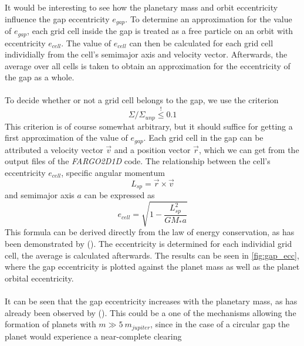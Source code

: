     \newpage
      It would be interesting to see how the planetary mass and orbit 
      eccentricity influence the gap eccentricity $e_{gap}$.
      To determine an approximation for the value of $e_{gap}$, each grid cell 
      inside the gap is treated as a free particle on an orbit with 
      eccentricity $e_{cell}$.
      The value of $e_{cell}$ can then be calculated for each grid cell 
      individially from the cell's semimajor axis and velocity vector. 
      Afterwards, the average over all cells is taken to obtain an 
      approximation for the eccentricity of the gap as a whole. \\
      \\
      To decide whether or not a grid cell belongs to the gap, we use the 
      criterion
      $$\Sigma/\Sigma_{unp}\overset{!}{\leq}0.1$$
      This criterion is of course somewhat arbitrary, but it should suffice 
      for getting a first approximation of the value of $e_{gap}$.
      Each grid cell in the gap can be attributed a velocity vector $\vec v$ 
      and a position vector $\vec r$, which we can get from the output files 
      of the \textit{FARGO2D1D} code. The relationship between the cell's 
      eccentricity $e_{cell}$, specific angular momentum 
      \begin{equation}
        L_{sp}=\vec r\times\vec v
      \end{equation}
      and semimajor axis $a$ can be expressed as
      \begin{equation}
        e_{cell}=\sqrt{1-\frac{L_{sp}^2}{GM_*a}}
      \end{equation}
      This formula can be derived directly from the law of energy conservation, 
      as has been demonstrated by \citeauthor{Bitsch_2013} 
      (\citeyear{Bitsch_2013}). The eccentricity is determined for each 
      individial grid cell, the average is calculated afterwards. The results 
      can be seen in \autoref{fig:gap_ecc}, where the gap eccentricity is 
      plotted against the planet mass as well as the planet orbital 
      eccentricity. \\
      \\
      It can be seen that the gap eccentricity increases with the planetary 
      mass, as has already been observed by \citeauthor{Kley_2006} 
      (\citeyear{Kley_2006}). This could be a one of the mechanisms allowing 
      the formation of planets with $m\gg5\ m_{jupiter}$, since in the case
      of a circular gap the planet would experience a near-complete clearing 
